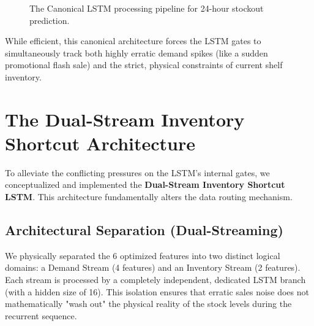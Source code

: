 \begin{figure}[ht]
    \centering
    \caption{The Canonical LSTM processing pipeline for 24-hour stockout prediction.}
    \label{fig:canonical_lstm}
\end{figure}

While efficient, this canonical architecture forces the LSTM gates to simultaneously track both highly erratic demand spikes (like a sudden promotional flash sale) and the strict, physical constraints of current shelf inventory.

\section{The Dual-Stream Inventory Shortcut Architecture}

To alleviate the conflicting pressures on the LSTM's internal gates, we conceptualized and implemented the \textbf{Dual-Stream Inventory Shortcut LSTM}. This architecture fundamentally alters the data routing mechanism.

\subsection{Architectural Separation (Dual-Streaming)}
We physically separated the 6 optimized features into two distinct logical domains: a Demand Stream (4 features) and an Inventory Stream (2 features). Each stream is processed by a completely independent, dedicated LSTM branch (with a hidden size of 16). This isolation ensures that erratic sales noise does not mathematically "wash out" the physical reality of the stock levels during the recurrent sequence.

